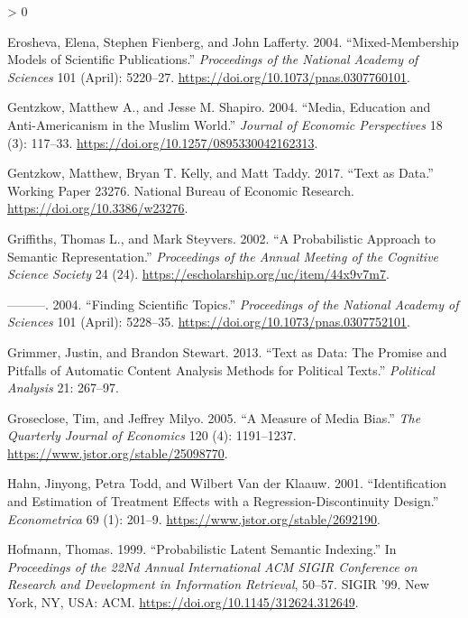 \documentclass[
]{article}
\newlength{\cslhangindent}
\newenvironment{CSLReferences}[2] %
 {%
  \setlength{\parindent}{0pt}
  \ifodd #1 \everypar{\setlength{\hangindent}{\cslhangindent}}\ignorespaces\fi
  \ifnum #2 > 0
  \setlength{\parskip}{#2\baselineskip}
  \fi
 }%
 {}
\begin{document}
\begin{CSLReferences}{1}{0}
\leavevmode\hypertarget{ref-erosheva_mixed-membership_2004}{}%
Erosheva, Elena, Stephen Fienberg, and John Lafferty. 2004.
{``Mixed-Membership Models of Scientific Publications.''}
\emph{Proceedings of the National Academy of Sciences} 101 (April):
5220--27. \url{https://doi.org/10.1073/pnas.0307760101}.

\leavevmode\hypertarget{ref-gentzkow_media_2004}{}%
Gentzkow, Matthew A., and Jesse M. Shapiro. 2004. {``Media, Education
and Anti-Americanism in the Muslim World.''} \emph{Journal of Economic
Perspectives} 18 (3): 117--33.
\url{https://doi.org/10.1257/0895330042162313}.

\leavevmode\hypertarget{ref-gentzkow_text_2017}{}%
Gentzkow, Matthew, Bryan T. Kelly, and Matt Taddy. 2017. {``Text as
Data.''} Working Paper 23276. National Bureau of Economic Research.
\url{https://doi.org/10.3386/w23276}.

\leavevmode\hypertarget{ref-griffiths_probabilistic_2002}{}%
Griffiths, Thomas L., and Mark Steyvers. 2002. {``A Probabilistic
Approach to Semantic Representation.''} \emph{Proceedings of the Annual
Meeting of the Cognitive Science Society} 24 (24).
\url{https://escholarship.org/uc/item/44x9v7m7}.

\leavevmode\hypertarget{ref-griffiths_finding_2004}{}%
---------. 2004. {``Finding Scientific Topics.''} \emph{Proceedings of
the National Academy of Sciences} 101 (April): 5228--35.
\url{https://doi.org/10.1073/pnas.0307752101}.

\leavevmode\hypertarget{ref-grimmer_text_2013}{}%
Grimmer, Justin, and Brandon Stewart. 2013. {``Text as Data: The Promise
and Pitfalls of Automatic Content Analysis Methods for Political
Texts.''} \emph{Political Analysis} 21: 267--97.

\leavevmode\hypertarget{ref-groseclose_measure_2005}{}%
Groseclose, Tim, and Jeffrey Milyo. 2005. {``A Measure of Media Bias.''}
\emph{The Quarterly Journal of Economics} 120 (4): 1191--1237.
\url{https://www.jstor.org/stable/25098770}.

\leavevmode\hypertarget{ref-hahn_identification_2001}{}%
Hahn, Jinyong, Petra Todd, and Wilbert Van der Klaauw. 2001.
{``Identification and Estimation of Treatment Effects with a
Regression-Discontinuity Design.''} \emph{Econometrica} 69 (1): 201--9.
\url{https://www.jstor.org/stable/2692190}.

\leavevmode\hypertarget{ref-hofmann_probabilistic_1999}{}%
Hofmann, Thomas. 1999. {``Probabilistic Latent Semantic Indexing.''} In
\emph{Proceedings of the 22Nd Annual International {ACM} {SIGIR}
Conference on Research and Development in Information Retrieval},
50--57. {SIGIR} '99. New York, {NY}, {USA}: {ACM}.
\url{https://doi.org/10.1145/312624.312649}.


\end{CSLReferences}
\end{document}
